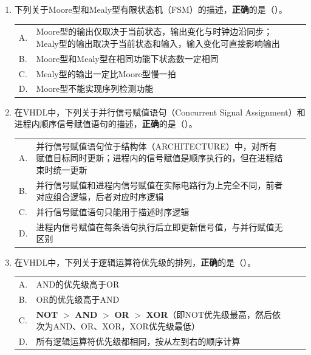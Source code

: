 \begin{enumerate}[label=\arabic*.]
\vspace{0.8cm}

\item 下列关于Moore型和Mealy型有限状态机（FSM）的描述，\textbf{正确}的是（\quad）。

\vspace{0.3cm}

\begin{tabular}{@{}lp{}@{\qquad}lp{}@{}}
A. & Moore型的输出仅取决于当前状态，输出变化与时钟边沿同步；Mealy型的输出取决于当前状态和输入，输入变化可直接影响输出 \\
B. & Moore型和Mealy型在相同功能下状态数一定相同 \\
C. & Mealy型的输出一定比Moore型慢一拍 \\
D. & Moore型不能实现序列检测功能 \\
\end{tabular}

\vspace{0.8cm}

\item 在VHDL中，下列关于并行信号赋值语句（Concurrent Signal Assignment）和进程内顺序信号赋值语句的描述，\textbf{正确}的是（\quad）。

\vspace{0.3cm}

\begin{tabular}{@{}lp{}@{\qquad}lp{}@{}}
A. & 并行信号赋值语句位于结构体（ARCHITECTURE）中，对所有赋值目标同时更新；进程内的信号赋值是顺序执行的，但在进程结束时统一更新 \\
B. & 并行信号赋值和进程内信号赋值在实际电路行为上完全不同，前者对应组合逻辑，后者对应时序逻辑 \\
C. & 并行信号赋值语句只能用于描述时序逻辑 \\
D. & 进程内信号赋值在每条语句执行后立即更新信号值，与并行赋值无区别 \\
\end{tabular}

\vspace{0.8cm}

\item 在VHDL中，下列关于逻辑运算符优先级的排列，\textbf{正确}的是（\quad）。

\vspace{0.3cm}

\begin{tabular}{@{}lp{}@{\qquad}lp{}@{}}
A. & AND的优先级高于OR \\
B. & OR的优先级高于AND \\
C. & \textbf{NOT} $>$ \textbf{AND} $>$ \textbf{OR} $>$ \textbf{XOR}（即NOT优先级最高，然后依次为AND、OR、XOR，XOR优先级最低） \\
D. & 所有逻辑运算符优先级都相同，按从左到右的顺序计算 \\
\end{tabular}

\vspace{0.3cm}

\end{enumerate}

